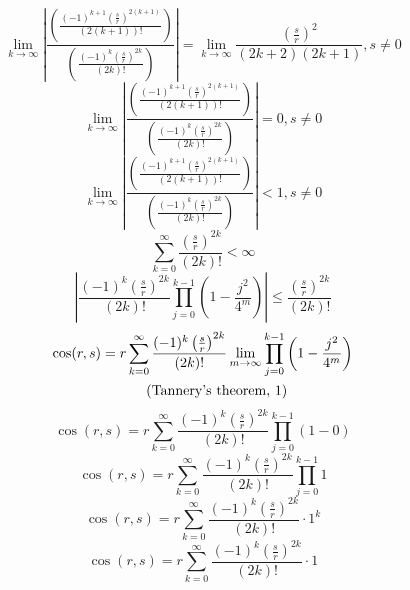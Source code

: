 \documentclass[a4paper,12pt]{report}
\newcommand{\equationnote}[1]{%
    \refstepcounter{equation}%
    \tag{#1, \theequation}%
}
\begin{document}
\begin{equation}
\lim \limits_{k \to \infty} \left|\frac{\left(\frac{(-1)^{k+1} \left(\frac{s}{r}\right)^{2(k+1)}}{(2(k+1))!}\right)}{\left(\frac{(-1)^k \left(\frac{s}{r}\right)^{2k}}{(2k)!}\right)}\right| = \lim \limits_{k \to \infty} \frac{\left(\frac{s}{r}\right)^2}{(2k+2)(2k+1)}, s \neq 0
\end{equation}
\begin{equation}
\lim \limits_{k \to \infty} \left|\frac{\left(\frac{(-1)^{k+1} \left(\frac{s}{r}\right)^{2(k+1)}}{(2(k+1))!}\right)}{\left(\frac{(-1)^k \left(\frac{s}{r}\right)^{2k}}{(2k)!}\right)}\right| = 0, s \neq 0
\end{equation}
\begin{equation}
\lim \limits_{k \to \infty} \left|\frac{\left(\frac{(-1)^{k+1} \left(\frac{s}{r}\right)^{2(k+1)}}{(2(k+1))!}\right)}{\left(\frac{(-1)^k \left(\frac{s}{r}\right)^{2k}}{(2k)!}\right)}\right| < 1, s \neq 0
\end{equation}
\begin{equation}
\sum \limits_{k=0}^{\infty} \frac{\left(\frac{s}{r}\right)^{2k}}{(2k)!} < \infty
\end{equation}
\begin{equation}
\left|\frac{(-1)^k \left(\frac{s}{r}\right)^{2k}}{(2k)!} \prod \limits_{j=0}^{k-1} \left(1 - \frac{j^2}{4^m}\right)\right| \leq \frac{\left(\frac{s}{r}\right)^{2k}}{(2k)!}
\end{equation}
\begin{gather}
\cos(r,s) = r \sum \limits_{k=0}^{\infty} \frac{(-1)^k \left(\frac{s}{r}\right)^{2k}}{(2k)!} \lim \limits_{m \to \infty} \prod \limits_{j=0}^{k-1} \left(1 - \frac{j^2}{4^m}\right) \notag \\
\equationnote{Tannery's theorem}
\end{gather}
\begin{equation}
\cos(r,s) = r \sum \limits_{k=0}^{\infty} \frac{(-1)^k \left(\frac{s}{r}\right)^{2k}}{(2k)!} \prod \limits_{j=0}^{k-1} (1 - 0)
\end{equation}
\begin{equation}
\cos(r,s) = r \sum \limits_{k=0}^{\infty} \frac{(-1)^k \left(\frac{s}{r}\right)^{2k}}{(2k)!} \prod \limits_{j=0}^{k-1} 1
\end{equation}
\begin{equation}
\cos(r,s) = r \sum \limits_{k=0}^{\infty} \frac{(-1)^k \left(\frac{s}{r}\right)^{2k}}{(2k)!} \cdot 1^k
\end{equation}
\begin{equation}
\cos(r,s) = r \sum \limits_{k=0}^{\infty} \frac{(-1)^k \left(\frac{s}{r}\right)^{2k}}{(2k)!} \cdot 1
\end{equation}
\end{document}
